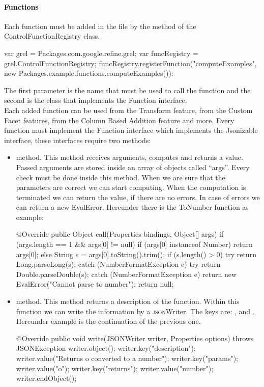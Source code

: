\paragraph{Functions}
Each function must be added in the  file by the  method of the ControlFunctionRegistry class. 
\begin{code}
var grel = Packages.com.google.refine.grel;
var funcRegistry = grel.ControlFunctionRegistry;
funcRegistry.registerFunction("computeExamples",
    new Packages.example.functions.computeExamples()):
\end{code}
The first parameter is the name that must be used to call the function and the second is the class that implements the Function interface. \\ Each added function can be used from the Transform feature, from the Custom Facet features, from the Column Based Addition feature and more.
Every function must implement the Function interface which implements the Jsonizable interface, these interfaces require two methods:
\begin{itemize}
	\item {} method. This method receives arguments, computes and returns a value. Passed arguments are stored inside an array of objects called ``args''. Every check must be done inside this method. When we are sure that the parameters are correct we can start computing. When the computation is terminated we can return the value, if there are no errors. In case of errors we can return a new EvalError. Hereunder there is the ToNumber function as example:
	\begin{code}
@Override
public Object call(Properties bindings, Object[] args) {
     if (args.length == 1 && args[0] != null) {
         if (args[0] instanceof Number) {
             return args[0];
         } else {
             String s = args[0].toString().trim();
             if (s.length() > 0) {
                 try {
                    return Long.parseLong(s);
                 } catch (NumberFormatException e) { }
                 try {
                    return Double.parseDouble(s);
                 } catch (NumberFormatException e) {
                    return
                     new EvalError("Cannot parse to number");
                 }
             }
         }
     }
     return null;
} 
	\end{code}	
	\item {} method. This method returns a description of the function. Within this function we can write the information by a \textsc{json}Writer. The keys are: ,  and . Hereunder example is the continuation of the previous one.
	\begin{code}
@Override
public void write(JSONWriter writer, Properties options)
     throws JSONException {
     writer.object();
     writer.key("description"); 
     writer.value("Returns o converted to a number");
     writer.key("params"); writer.value("o");
     writer.key("returns"); writer.value("number");
     writer.endObject();
} 
	\end{code}
\end{itemize}


